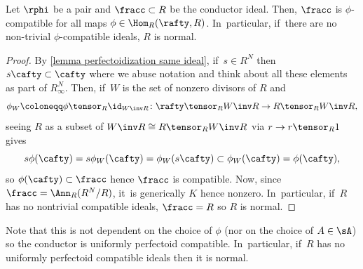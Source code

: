 \begin{proposition}\label{conductor ideal is compatible}
Let $\rphi$ be a pair and $\fracc\subset R$ be the conductor ideal. Then, $\fracc$ is $\phi$-compatible
for all maps $\phi\in \Hom_R(\rafty,R)$. In~particular, if~there are no non-trivial $\phi$-compatible ideals, $R$ is normal.
\end{proposition}

\begin{proof}
By \autoref{lemma perfectoidization same ideal}, if~$s\in R^N$ then $s\cafty\subset \cafty$ where we abuse notation and think about all these elements as part of $R^N_\infty$. Then, if~$W$ is the set of nonzero divisors of $R$ and
\[
\phi_W\coloneqq \phi\tensor_R \id_{W\inv R}\colon \rafty\tensor_R W\inv R\to R\tensor_R W\inv R,
\]
seeing $R$ as a subset of $W\inv R\cong R\tensor_R W\inv R$ via $r\to r\tensor_R 1$ gives
\[
s\phi(\cafty)=s \phi_W(\cafty)= \phi_W(s \cafty) \subset \phi_W(\cafty)= \phi(\cafty),
\]
so $\phi(\cafty)\subset \fracc$ hence $\fracc$ is compatible. Now, since $\fracc=\Ann_R(R^N/R)$, it~is generically $K$ hence nonzero. In~particular, if~$R$ has no nontrivial compatible ideals, $\fracc=R$ so $R$ is normal.
\end{proof}
\begin{remark}\label{conductor uniformly compatible}
Note that this is not dependent on the choice of $\phi$ (nor on the choice of $A\in \sA$) so the conductor is uniformly perfectoid compatible. In~particular, if~$R$ has no uniformly perfectoid compatible ideals then it is normal.
\end{remark}

